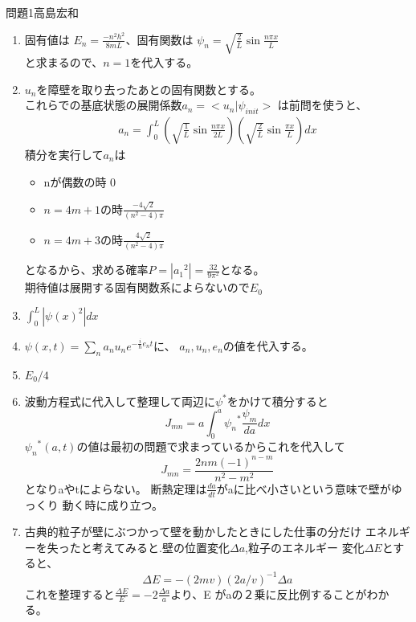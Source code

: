 \documentclass[fleqn]{jbook}
\begin{document}
\begin{answer}{問題1}{高島宏和}
\begin{enumerate}
\item 固有値は
  $E_n=\frac{-n^2 h^2}{8mL}$、固有関数は      
  $ \psi_n=\sqrt{\frac{2}{L}}\sin{\frac{n\pi x}{L}}$  \\
  と求まるので、$n=1$を代入する。\\
\item $u_n$を障壁を取り去ったあとの固有関数とする。\\
 これらでの基底状態の展開係数$a_n=<u_n | \psi_{init}> $
 は前問を使うと、
\begin{eqnarray}
a_n=\int _0 ^L \left(\sqrt{\frac{1}{L}}\sin{\frac{n \pi x}{2L}}\right)\left(\sqrt{\frac{2}{L}}\sin{\frac{\pi x}{L}}\right)dx
\end{eqnarray}
 積分を実行して$a_n$は
\begin{itemize}
\item nが偶数の時 0
\item $n=4m+1$の時$\frac{-4\sqrt{2}}{(n^2-4)\pi}$
\item $n=4m+3$の時$\frac{4\sqrt{2}}{(n^2-4)\pi}$
\end{itemize}
となるから、求める確率$P=|{a_1}^2|=\frac{32}{9\pi^2}$となる。\\
期待値は展開する固有関数系によらないので$E_0$\\
\item $ \int _0 ^L |\psi \left(x \right)^2 | dx$
\item $\psi (x,t)=\sum _n a_n u_n e^{-\frac{i}{\hbar}e_n t}$に、
 $a_n , u_n,e_n$の値を代入する。
\item $E_0/4$
\item 波動方程式に代入して整理して両辺に$\psi^*$をかけて積分すると\\
\begin{equation}
 J_{mn}=a \int _0 ^a {\psi_n}^*\frac{\psi_m}{da} dx
\end{equation}
${\psi_n}^*(a,t)$の値は最初の問題で求まっているからこれを代入して
\begin{equation}
 J_{mn}=\frac{2nm(-1)^{n-m}}{n^2-m^2}
\end{equation}
となりaやtによらない。
断熱定理は$\frac{da}{dt} $がaに比べ小さいという意味で壁がゆっくり
動く時に成り立つ。\\
\item 古典的粒子が壁にぶつかって壁を動かしたときにした仕事の分だけ
エネルギーを失ったと考えてみると.壁の位置変化$\Delta a$,粒子のエネルギー
変化$\Delta E$とすると、
\begin{equation}
\Delta E=- (2mv)(2a/v)^{-1} \Delta a
\end{equation}
これを整理すると$\frac{\Delta E}{E}=-2 \frac{\Delta a}{a}$より、E
がaの２乗に反比例することがわかる。
\end{enumerate}
\end{answer}
\end{document}
